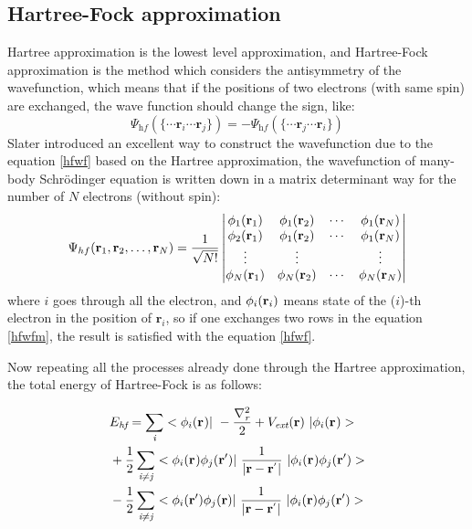 \documentclass[a4paper, 12pt, titlepage,oneside,drop]{kthesis}
\begin{document}
\subsection{Hartree-Fock approximation}
\noindent Hartree approximation is the lowest level approximation, and Hartree-Fock approximation is the method which considers the 
antisymmetry of the wavefunction, which means that if the positions of two electrons (with same spin) are exchanged, the wave 
function should change the sign, like:
\begin{equation}\label{hfwf}
\Psi_\textit{hf} (\{ \cdots \textbf{r}_\textit{i} \cdots  \textbf{r}_\textit{j} \}) = - \Psi_\textit{hf} (\{ \cdots \textbf{r}_\textit{j} \cdots  \textbf{r}_\textit{i} \})
\end{equation}
\noindent Slater introduced  an excellent way to construct the wavefunction due to the equation \ref{hfwf} based on the Hartree approximation, 
the wavefunction of many- body Schrödinger equation is written down  in a matrix determinant way for the number of $N$ electrons 
(without spin):
\begin{equation}\label{hfwfm}
\Psi_{hf}(\mathbf{r}_1, \mathbf{r}_2, \ldots, \mathbf{r}_N) =
\frac{1}{\sqrt{N!}} \left|
\begin{matrix}
    \bwf<1><1> & \bwf<1><2> & \cdots & \bwf<1><N> \\
    \bwf<2><1> & \bwf<1><2> & \cdots & \bwf<1><N> \\
    \vdots               & \vdots               &        & \vdots               \\
    \bwf<N><1> & \bwf<N><2> & \cdots & \bwf<N><N>
\end{matrix} \right|
\end{equation}
\noindent where $i$ goes through all the electron, and $\bwf<i><i>$ means state of the ($i$)-th electron in the position of $\textbf{r}_\textit{i}$, so if one exchanges two rows
 in the equation \ref{hfwfm}, the result is satisfied with the equation \ref{hfwf}.

\noindent Now repeating all the processes already done through the Hartree approximation, the total energy of Hartree-Fock is as follows:

\begin{equation}\begin{split}
&E_\textit{hf} = \sumi<i> <\bwf<i><> |\ -\frac{\nabla^{2}_{\textit r}}{2} + V_\textit{ext}(\textbf{r})  \ | \bwf<i><> > \\
& + \frac{1}{2} \suminj<i><j> <\bwf<i><> \bwfn<j><'>|\ \frac{1}{|\textbf{r} - \textbf{r}^{'} |} \ | \bwf<i><> \bwfn<j><'>> \\
& - \frac{1}{2} \suminj<i><j> <\bwfn<i><'> \bwfn<j><>|\ \frac{1}{|\textbf{r} - \textbf{r}^{'} |} \ | \bwfn<i><> \bwfn<j><'>>
\end{split}\end{equation}
\end{document}
